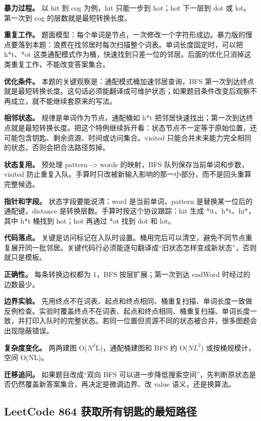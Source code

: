 \textbf{暴力过程。} 以 hit 到 cog 为例，hit 只能一步到 hot；hot 下一层到 dot 或 lot。第一次到 cog 的层数就是最短转换长度。

\textbf{重复工作。} 题面模型：每个单词是节点，一次修改一个字符形成边。暴力版的慢点要落到本题：浪费在找邻居时每次扫描整个词表。单词长度固定时，可以把 h*t、*ot 这类通配模式作为桶，快速找到只差一位的邻居。后面的优化只消掉这类重复工作，不能改变答案集合。

\textbf{优化条件。} 本题的关键观察是：通配模式桶加速邻居查询，BFS 第一次到达终点就是最短转换长度。这句话必须能翻译成可维护状态；如果题目条件改变后观察不再成立，就不能继续套原来的写法。

\textbf{相邻状态。} 规律是单词作为节点，通配桶如 h*t 把邻居快速找出；第一次到达终点就是最短转换长度。把这个特例继续拆开看：状态节点不一定等于原始位置，还可能包含钥匙、剩余资源、时间或访问集合。visited 只能合并未来能力完全相同的状态，否则会把合法路径剪掉。

\textbf{状态复用。} 预处理 pattern -> words 的映射，BFS 队列保存当前单词和步数，visited 防止重复入队。手算时只改被新输入影响的那一小部分，而不是回头重算完整候选。

\textbf{指针和字段。} 状态字段要能说清：word 是当前单词，pattern 是替换某一位后的通配键，distance 是转换层数。手算时按这个协议跟踪：hit 生成 *it、h*t、hi*，其中 h*t 桶找到 hot；hot 再通过 *ot 找到 dot 和 lot。

\textbf{代码落点。} 关键是访问标记在入队时设置。桶用完后可以清空，避免不同节点重复展开同一批邻居。关键代码行必须能逐句翻译成“旧状态怎样变成新状态”，否则就只是模板。

\textbf{正确性。} 每条转换边权都为 1，BFS 按层扩展；第一次到达 endWord 时经过的边数最少。

\textbf{边界实验。} 先用终点不在词表、起点和终点相同、桶重复扫描、单词长度一致做反例检查。实验时覆盖终点不在词表、起点和终点相同、桶重复扫描、单词长度一致，并打印入队时的完整状态。若同一位置但资源不同的状态被合并，很多图题会出现隐蔽错误。

\textbf{复杂度变化。} 两两建图 O(\ensuremath{N^{2}}L)，通配桶建图和 BFS 约 O(\ensuremath{NL^{2}}) 或按桶规模计，空间 O(NL)。

\textbf{迁移追问。} 如果题目改成“双向 BFS 可以进一步降低搜索空间”，先判断原状态是否仍然覆盖新答案集合，再决定是微调边界、改 value 语义，还是换算法。

\subsection{LeetCode 864 获取所有钥匙的最短路径}

